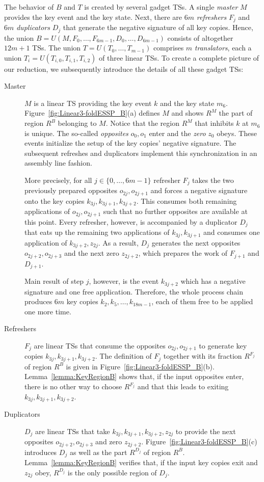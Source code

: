\documentclass[english]{lipics_hacked}
\begin{document}
The behavior of $B$ and $T$ is created by several gadget TSs.
A single \emph{master} $M$ provides the key event and the key state.
Next, there are $6m$ \emph{refreshers} $F_j$ and $6m$ \emph{duplicators} $D_j$ that generate the negative signature of all key copies.
Hence, the union $B = U(M, F_0, \dots, F_{6m-1}, D_0, \dots, D_{6m-1})$ consists of altogether $12m+1$ TSs.
The union $T = U(T_0, \dots, T_{m-1})$ comprises $m$ \emph{translators}, each a union $T_i = U(T_{i,0}, T_{i,1}, T_{i,2})$ of three linear TSs.
To create a complete picture of our reduction, we subsequently introduce the details of all these gadget TSs:
%
\begin{description}
%
\item[Master] 
$M$ is a linear TS providing the key event $k$ and the key state $m_6$.
Figure~\ref{fig:Linear3-foldESSP_B}(a) defines $M$ and shows $R^M$ the part of region $R^B$ belonging to $M$.
Notice that the region $R^M$ that inhibits $k$ at $m_6$ is unique.
The so-called \emph{opposites} $o_0,o_1$ enter and the \emph{zero} $z_0$ obeys.
These events initialize the setup of the key copies' negative signature.
The subsequent refreshes and duplicators implement this synchronization in an assembly line fashion. 

More precisely, for all $j \in \{0, \dots, 6m-1\}$ refresher $F_j$ takes the two previously prepared opposites $o_{2j},o_{2j+1}$ and forces a negative signature onto the key copies $k_{3j},k_{3j+1},k_{3j+2}$.
This consumes both remaining applications of $o_{2j},o_{2j+1}$ such that no further opposites are available at this point.
Every refresher, however, is accompanied by a duplicator $D_j$ that eats up the remaining two applications of $k_{3j},k_{3j+1}$ and consumes one application of $k_{3j+2}, z_{2j}$.
As a result, $D_j$ generates the next opposites $o_{2j+2},o_{2j+3}$ and the next zero $z_{2j+2}$, which prepares the work of $F_{j+1}$ and $D_{j+1}$.

Main result of step $j$, however, is the event $k_{3j+2}$ which has a negative signature and one free application.
Therefore, the whole process chain produces $6m$ key copies $k_{2}, k_{5}, \dots, k_{18m-1}$, each of them free to be applied one more time.
%
\item[Refreshers]
$F_j$ are linear TSs that consume the opposites  $o_{2j},o_{2j+1}$ to generate key copies $k_{3j},k_{3j+1},k_{3j+2}$.
The definition of $F_j$ together with its fraction $R^{F_j}$ of region $R^B$ is given in Figure~\ref{fig:Linear3-foldESSP_B}(b).
Lemma~\ref{lemma:KeyRegionB} shows that, if the input opposites enter, there is no other way to choose $R^{F_j}$ and that this leads to exiting $k_{3j},k_{3j+1},k_{3j+2}$.

\item[Duplicators]
$D_j$ are linear TSs that take $k_{3j},k_{3j+1},k_{3j+2},z_{2j}$ to provide the next opposites $o_{2j+2},o_{2j+3}$ and zero $z_{2j+2}$.
Figure~\ref{fig:Linear3-foldESSP_B}(c) introduces $D_j$ as well as the part $R^{D_j}$ of region $R^B$.
Lemma~\ref{lemma:KeyRegionB} verifies that, if the input key copies exit and $z_{2j}$ obey, $R^{D_j}$ is the only possible region of $D_j$. 
\end{description}
\end{document}
